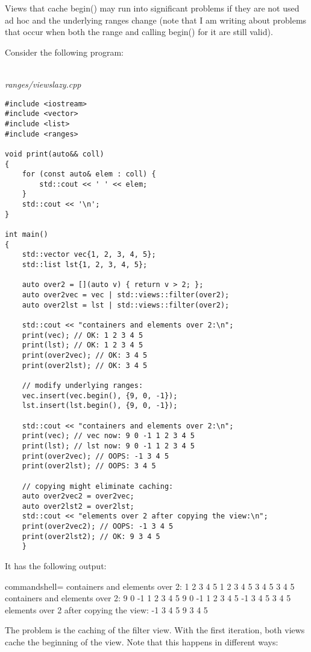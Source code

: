 Views that cache begin() may run into significant problems if they are not used ad hoc and the underlying ranges change (note that I am writing about problems that occur when both the range and calling begin() for it are still valid).

Consider the following program:

\noindent
\hspace*{\fill} \\ %
\textit{ranges/viewslazy.cpp}

\begin{lstlisting}[style=styleCXX]
#include <iostream>
#include <vector>
#include <list>
#include <ranges>

void print(auto&& coll)
{
	for (const auto& elem : coll) {
		std::cout << ' ' << elem;
	}
	std::cout << '\n';
}

int main()
{
	std::vector vec{1, 2, 3, 4, 5};
	std::list lst{1, 2, 3, 4, 5};
	
	auto over2 = [](auto v) { return v > 2; };
	auto over2vec = vec | std::views::filter(over2);
	auto over2lst = lst | std::views::filter(over2);
	
	std::cout << "containers and elements over 2:\n";
	print(vec); // OK: 1 2 3 4 5
	print(lst); // OK: 1 2 3 4 5
	print(over2vec); // OK: 3 4 5
	print(over2lst); // OK: 3 4 5
	
	// modify underlying ranges:
	vec.insert(vec.begin(), {9, 0, -1});
	lst.insert(lst.begin(), {9, 0, -1});
	
	std::cout << "containers and elements over 2:\n";
	print(vec); // vec now: 9 0 -1 1 2 3 4 5
	print(lst); // lst now: 9 0 -1 1 2 3 4 5
	print(over2vec); // OOPS: -1 3 4 5
	print(over2lst); // OOPS: 3 4 5
	
	// copying might eliminate caching:
	auto over2vec2 = over2vec;
	auto over2lst2 = over2lst;
	std::cout << "elements over 2 after copying the view:\n";
	print(over2vec2); // OOPS: -1 3 4 5
	print(over2lst2); // OK: 9 3 4 5
	}
\end{lstlisting}

It has the following output:

{\footnotesize
\begin{tcblisting}{commandshell={}}
containers and elements over 2:
1 2 3 4 5
1 2 3 4 5
3 4 5
3 4 5
containers and elements over 2:
9 0 -1 1 2 3 4 5
9 0 -1 1 2 3 4 5
-1 3 4 5
3 4 5
elements over 2 after copying the view:
-1 3 4 5
9 3 4 5
\end{tcblisting}
}

The problem is the caching of the filter view. With the first iteration, both views cache the beginning of the view. Note that this happens in different ways:

